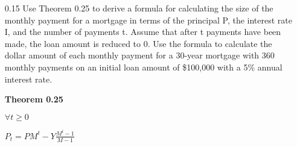 \begin{enumerate}
\item[0.15]
Use Theorem 0.25 to derive a formula for calculating the size of the monthly payment for a mortgage in terms of the principal P, the interest rate I, and the number of payments t. Assume that after t payments have been made, the loan amount is reduced to 0. Use the formula to calculate the dollar amount of each monthly payment for a 30-year mortgage with 360 monthly payments on an initial loan amount of \$100,000 with a 5\% annual interest rate.


\textbf{Theorem 0.25}

$\forall t \geq 0$


$P_t=PM^t-Y\frac{M^t-1}{M-1}$
\end{enumerate}